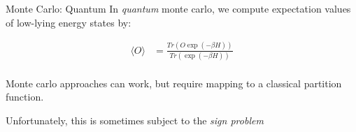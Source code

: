\documentclass[10pt]{beamer}
\begin{document}
\begin{frame}{Monte Carlo: Quantum}
In \emph{quantum} monte carlo, we compute expectation values of low-lying energy states by:

\begin{align*}
    \langle O \rangle& =  \frac{Tr(O \exp(-\beta H))}{Tr(\exp(-\beta H))} \\
\end{align*}  

Monte carlo approaches can work, but require mapping to a classical partition function.

Unfortunately, this is sometimes subject to the \emph{sign problem}






\end{frame}
\end{document}
